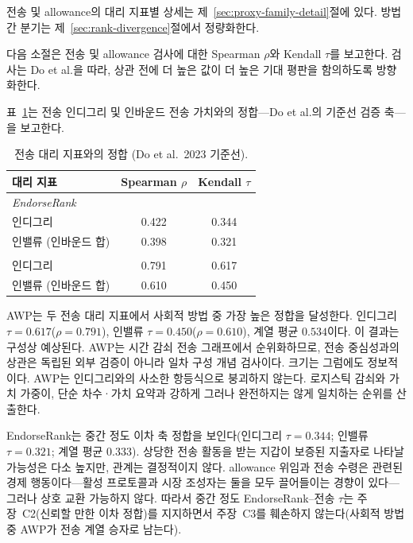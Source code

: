 전송 및 allowance의 대리 지표별 상세는 제~\ref{sec:proxy-family-detail}절에 있다. 방법 간 분기는 제~\ref{sec:rank-divergence}절에서 정량화한다.


다음 소절은 전송 및 allowance 검사에 대한 Spearman $\rho$와 Kendall $\tau$를 보고한다. 검사는 Do et al.을 따라, 상관 전에 더 높은 값이 더 높은 기대 평판을 함의하도록 방향화한다.


표~\ref{tab:alignment-transfer}는 전송 인디그리 및 인바운드 전송 가치와의 정합---Do et al.의 기준선 검증 축---을 보고한다.

\begin{table}[htbp]
\centering
\caption{전송 대리 지표와의 정합 (Do et al.\ 2023 기준선).}
\label{tab:alignment-transfer}
\begin{tabular}{lcc}
\toprule
대리 지표 & Spearman $\rho$ & Kendall $\tau$ \\
\midrule
\multicolumn{3}{l}{\textit{EndorseRank}} \\
인디그리 & 0.422 & 0.344 \\
인밸류 (인바운드 합) & 0.398 & 0.321 \\
\addlinespace
\multicolumn{3}{l}{\textit{AWP}} \\
인디그리 & 0.791 & 0.617 \\
인밸류 (인바운드 합) & 0.610 & 0.450 \\
\bottomrule
\end{tabular}
\end{table}

AWP는 두 전송 대리 지표에서 사회적 방법 중 가장 높은 정합을 달성한다. 인디그리 $\tau=0.617$($\rho=0.791$), 인밸류 $\tau=0.450$($\rho=0.610$), 계열 평균 $0.534$이다. 이 결과는 구성상 예상된다. AWP는 시간 감쇠 전송 그래프에서 순위화하므로, 전송 중심성과의 상관은 독립된 외부 검증이 아니라 일차 구성 개념 검사이다. 크기는 그럼에도 정보적이다. AWP는 인디그리와의 사소한 항등식으로 붕괴하지 않는다. 로지스틱 감쇠와 가치 가중이, 단순 차수·가치 요약과 강하게 그러나 완전하지는 않게 일치하는 순위를 산출한다.

EndorseRank는 중간 정도 이차 축 정합을 보인다(인디그리 $\tau=0.344$; 인밸류 $\tau=0.321$; 계열 평균 $0.333$). 상당한 전송 활동을 받는 지갑이 보증된 지출자로 나타날 가능성은 다소 높지만, 관계는 결정적이지 않다. allowance 위임과 전송 수령은 관련된 경제 행동이다---활성 프로토콜과 시장 조성자는 둘을 모두 끌어들이는 경향이 있다---그러나 상호 교환 가능하지 않다. 따라서 중간 정도 EndorseRank--전송 $\tau$는 주장~C2(신뢰할 만한 이차 정합)를 지지하면서 주장~C3를 훼손하지 않는다(사회적 방법 중 AWP가 전송 계열 승자로 남는다).


